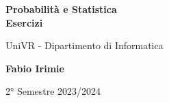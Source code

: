 \begin{titlepage}
	\begin{center}
		\vspace*{1cm}

		\Huge
		\textbf{Probabilità e Statistica\\Esercizi}

		\vspace{0.5cm}
		\LARGE
		UniVR - Dipartimento di Informatica

		\vspace{1.5cm}

		\textbf{Fabio Irimie}

		\vfill


		\vspace{0.8cm}


		2° Semestre 2023/2024

	\end{center}
\end{titlepage}
